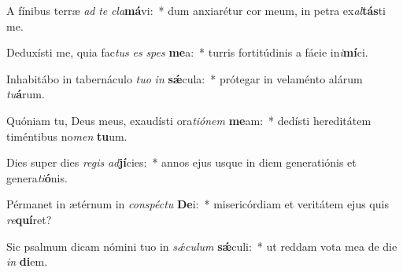 \item A fínibus terræ \textit{ad} \textit{te} \textit{cla}\textbf{má}vi:~* dum anxiarétur cor meum, in petra ex\textit{al}\textbf{tás}ti me.
\item Deduxísti me, quia fac\textit{tus} \textit{es} \textit{spes} \textbf{me}a:~* turris fortitúdinis a fácie in\textit{i}\textbf{mí}ci.
\item Inhabitábo in tabernáculo \textit{tu}\textit{o} \textit{in} \textbf{sǽ}cula:~* prótegar in velaménto alárum \textit{tu}\textbf{á}rum.
\item Quóniam tu, Deus meus, exaudísti ora\textit{ti}\textit{ó}\textit{nem} \textbf{me}am:~* dedísti hereditátem timéntibus no\textit{men} \textbf{tu}um.
\item Dies super dies \textit{re}\textit{gis} \textit{ad}\textbf{jí}cies:~* annos ejus usque in diem generatiónis et genera\textit{ti}\textbf{ó}nis.
\item Pérmanet in ætérnum in \textit{con}\textit{spéc}\textit{tu} \textbf{De}i:~* misericórdiam et veritátem ejus quis \textit{re}\textbf{quí}ret?
\item Sic psalmum dicam nómini tuo in \textit{sǽ}\textit{cu}\textit{lum} \textbf{sǽ}culi:~* ut reddam vota mea de die \textit{in} \textbf{di}em.
